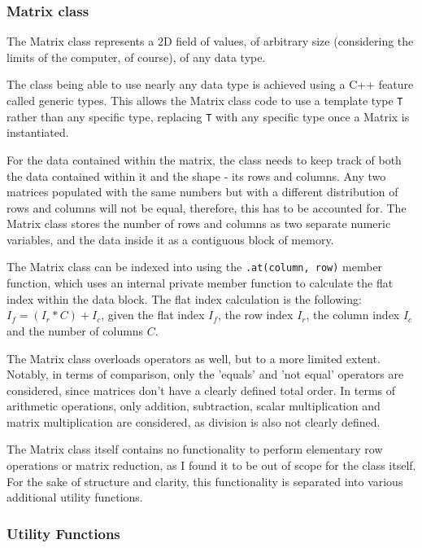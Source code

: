 \documentclass[11pt, a4paper]{article}
\begin{document}
\subsubsection{Matrix class}

The Matrix class represents a 2D field of values, of arbitrary size (considering the limits of the computer, of course), of any data type.

The class being able to use nearly any data type is achieved using a C++ feature called generic types.
This allows the Matrix class code to use a template type \texttt{T} rather than any specific type, replacing \texttt{T} with any specific type once a Matrix is instantiated.

For the data contained within the matrix, the class needs to keep track of both the data contained within it and the shape - its rows and columns.
Any two matrices populated with the same numbers but with a different distribution of rows and columns will not be equal, therefore, this has to be accounted for.
The Matrix class stores the number of rows and columns as two separate numeric variables, and the data inside it as a contiguous block of memory.

The Matrix class can be indexed into using the \texttt{.at(column, row)} member function, which uses an internal private member function to calculate the flat index within the data block.
The flat index calculation is the following: $I_f = (I_r * C) + I_c$, given the flat index $I_f$, the row index $I_r$, the column index $I_c$ and the number of columns $C$.

The Matrix class overloads operators as well, but to a more limited extent.
Notably, in terms of comparison, only the 'equals' and 'not equal' operators are considered, since matrices don't have a clearly defined total order.
In terms of arithmetic operations, only addition, subtraction, scalar multiplication and matrix multiplication are considered, as division is also not clearly defined.

The Matrix class itself contains no functionality to perform elementary row operations or matrix reduction, as I found it to be out of scope for the class itself.
For the sake of structure and clarity, this functionality is separated into various additional utility functions.


\subsubsection{Utility Functions}
\end{document}
